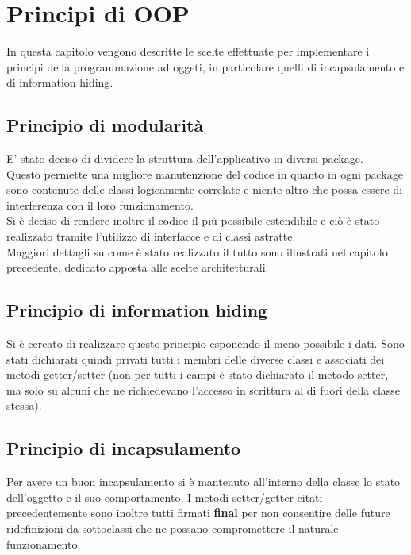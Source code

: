 % 
%
%

\section{Principi di OOP}
In questa capitolo vengono descritte le scelte effettuate per implementare i principi della programmazione ad oggeti, in particolare quelli di incapsulamento e di information hiding. \\

	\subsection{Principio di modularità}
E' stato deciso di dividere la struttura dell'applicativo in diversi package. \\
Questo permette una migliore manutenzione del codice in quanto in ogni package sono contenute delle classi logicamente correlate e niente altro che possa essere di interferenza con il loro funzionamento. \\
Si è deciso di rendere inoltre il codice il più possibile estendibile e ciò è stato realizzato tramite l'utilizzo di interfacce e di classi astratte. \\
Maggiori dettagli su come è stato realizzato il tutto sono illustrati nel capitolo precedente, dedicato apposta alle scelte architetturali.

	\subsection{Principio di information hiding}
Si è cercato di realizzare questo principio esponendo il meno possibile i dati. Sono stati dichiarati quindi privati tutti i membri delle diverse classi e associati dei metodi getter/setter (non per tutti i campi è stato dichiarato il metodo setter, ma solo su alcuni che ne richiedevano l'accesso in scrittura al di fuori della classe stessa).  \\

	\subsection{Principio di incapsulamento}
Per avere un buon incapsulamento si è mantenuto all'interno della classe lo stato dell'oggetto e il suo comportamento.
I metodi setter/getter citati precedentemente sono inoltre tutti firmati \textbf{final} per non consentire delle future ridefinizioni da sottoclassi che ne possano compromettere il naturale funzionamento. \\

